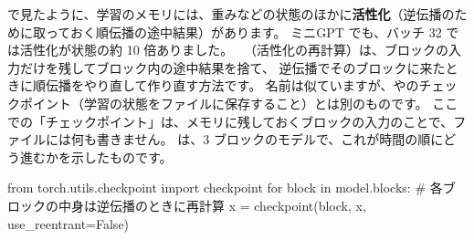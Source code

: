 で見たように、学習のメモリには、重みなどの状態のほかに\textbf{活性化}（逆伝播のために取っておく順伝播の途中結果）があります。
ミニGPT でも、バッチ 32 では活性化が状態の約 10 倍ありました。
~\cite{chen2016training}（活性化の再計算）は、ブロックの入力だけを残してブロック内の途中結果を捨て、
逆伝播でそのブロックに来たときに順伝播をやり直して作り直す方法です。
名前は似ていますが、やのチェックポイント（学習の状態をファイルに保存すること）とは別のものです。
ここでの「チェックポイント」は、メモリに残しておくブロックの入力のことで、ファイルには何も書きません。
は、3 ブロックのモデルで、これが時間の順にどう進むかを示したものです。
\begin{pycode}
from torch.utils.checkpoint import checkpoint
for block in model.blocks:      # 各ブロックの中身は逆伝播のときに再計算
    x = checkpoint(block, x, use_reentrant=False)
\end{pycode}

